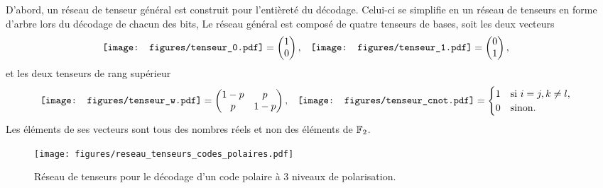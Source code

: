D'abord, 
un réseau de tenseur général est construit
pour l'entièreté du décodage.
Celui-ci se simplifie en un réseau de tenseurs en forme d'arbre
lors du décodage de chacun des bits,
Le réseau général est composé de quatre tenseurs de bases,
soit les deux vecteurs
\begin{align}
  &\vcenter{\hbox{\texttt{[image: figures/tenseur\_0.pdf]}}}
  =\begin{pmatrix}1\\0\end{pmatrix},
  &&\vcenter{\hbox{\texttt{[image: figures/tenseur\_1.pdf]}}}
  =\begin{pmatrix}0\\1\end{pmatrix},
  \label{eq:tenseurs_01}
\end{align}
et les deux tenseurs de rang supérieur
\begin{align}
  &\vcenter{\hbox{\texttt{[image: figures/tenseur\_w.pdf]}}}
  =
  \begin{pmatrix}1 - p & p \\ p & 1 - p\end{pmatrix}, 
  &&\vcenter{\hbox{\texttt{[image: figures/tenseur\_cnot.pdf]}}}
  =
  \begin{cases}
    1 & \text{si } i = j, k \neq l, \\
    0 & \text{sinon}.
  \end{cases}
  \label{eq:tenseurs_cp}
\end{align}
Les éléments de ses vecteurs sont tous des nombres réels et non des éléments de $\mathbb{F}_{2}$.

\begin{figure}
  \begin{center}
    \texttt{[image: figures/reseau\_tenseurs\_codes\_polaires.pdf]}
  \end{center}
  \caption[Exemple d'un réseau de tenseur pour décoder un code polaire]{
    Réseau de tenseurs pour le décodage d'un code polaire à 3 niveaux de polarisation.
  }
  \label{fig:reseau_tenseurs_codes_polaires}
\end{figure}

